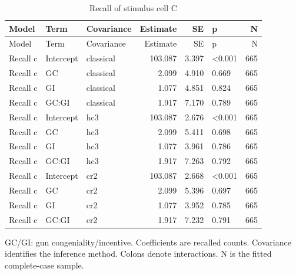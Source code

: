 
\begin{longtable}[t]{lllrrlr}
\caption{\label{tab:recallc}Recall of stimulus cell C}\\
\toprule
Model & Term & Covariance & Estimate & SE & p & N\\
\midrule
\endfirsthead
\toprule
Model & Term & Covariance & Estimate & SE & p & N\\
\midrule
\endhead
Recall c & Intercept & classical & 103.087 & 3.397 & <0.001 & 665\\
Recall c & GC & classical & 2.099 & 4.910 & 0.669 & 665\\
Recall c & GI & classical & 1.077 & 4.851 & 0.824 & 665\\
Recall c & GC:GI & classical & 1.917 & 7.170 & 0.789 & 665\\
Recall c & Intercept & hc3 & 103.087 & 2.676 & <0.001 & 665\\
Recall c & GC & hc3 & 2.099 & 5.411 & 0.698 & 665\\
Recall c & GI & hc3 & 1.077 & 3.961 & 0.786 & 665\\
Recall c & GC:GI & hc3 & 1.917 & 7.263 & 0.792 & 665\\
Recall c & Intercept & cr2 & 103.087 & 2.668 & <0.001 & 665\\
Recall c & GC & cr2 & 2.099 & 5.396 & 0.697 & 665\\
Recall c & GI & cr2 & 1.077 & 3.952 & 0.785 & 665\\
Recall c & GC:GI & cr2 & 1.917 & 7.232 & 0.791 & 665\\
\bottomrule
\end{longtable}
\noindent\footnotesize GC/GI: gun congeniality/incentive. Coefficients are recalled counts. Covariance identifies the inference method. Colons denote interactions. N is the fitted complete-case sample.\par\normalsize
